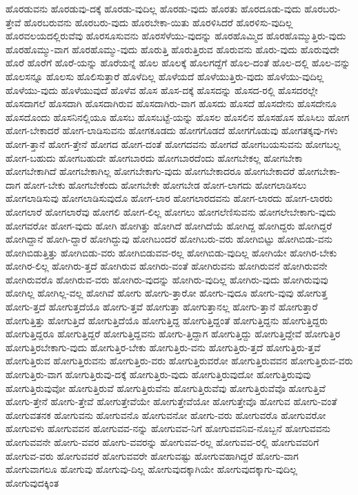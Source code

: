 {ಹೊರಡುವನು
ಹೊರಡುವು-ದಕ್ಕೆ
ಹೊರಡು-ವುದಿಲ್ಲ
ಹೊರಡು-ವುದು
ಹೊರತು
ಹೊರದೂಡು-ವುದು
ಹೊರಬರು-ತ್ತೇವೆ
ಹೊರಬರುವನು
ಹೊರಬರು-ವುದು
ಹೊರಬೇಕಾ-ಯಿತು
ಹೊರಳಿಸಿದರೆ
ಹೊರಳಿಸು-ವುದಿಲ್ಲ
ಹೊರವಲಯದಲ್ಲಿರುವೆವು
ಹೊರಸೂಸುವನು
ಹೊರಸೆಳೆಯು-ವುದನ್ನು
ಹೊರಹೊಮ್ಮಿದ
ಹೊರಹೊಮ್ಮುತ್ತಿರು-ವುದು
ಹೊರಹೊಮ್ಮು-ವಾಗ
ಹೊರಹೊಮ್ಮು-ವುದು
ಹೊರುತ್ತಿ
ಹೊರುತ್ತಿರುವ
ಹೊರುವನು
ಹೊರು-ವುದು
ಹೊರುವುದೇ
ಹೊರೆ
ಹೊರೆಗೆ
ಹೊರೆ-ಯನ್ನು
ಹೊರೆಯನ್ನೆ
ಹೊಲ
ಹೊಲಕ್ಕೆ
ಹೊಲಗದ್ದೆಗೆ
ಹೊಲ-ದಂತೆ
ಹೊಲ-ದಲ್ಲಿ
ಹೊಲ-ವನ್ನು
ಹೊಲಸನ್ನೂ
ಹೊಲಸು
ಹೊಲಿಸುತ್ತಾರೆ
ಹೊಳೆದಿಲ್ಲ
ಹೊಳೆಯದೆ
ಹೊಳೆಯುತ್ತಿರು-ವುದು
ಹೊಳೆಯು-ವುದಿಲ್ಲ
ಹೊಳೆಯು-ವುದು
ಹೊಳೆಯುವುದೆ
ಹೊಳೆವ
ಹೊಸ
ಹೊಸ-ದಕ್ಕೆ
ಹೊಸದನ್ನು
ಹೊಸದ-ರಲ್ಲಿ
ಹೊಸದರಲ್ಲೇ
ಹೊಸದಾಗಲೆ
ಹೊಸದಾಗಿ
ಹೊಸದಾಗಿರುವ
ಹೊಸದಾಗಿರು-ವಾಗ
ಹೊಸದು
ಹೊಸದೆ
ಹೊಸದೇನು
ಹೊಸದೇನೂ
ಹೊಸದೊಂದು
ಹೊಸನಿನಲ್ಲಿಯೂ
ಹೊಸಬ
ಹೊಸಬಟ್ಟೆ-ಯನ್ನು
ಹೊಸಲ
ಹೊಸಲಿನ
ಹೊಸಹೊಸ
ಹೊಸಿಲು
ಹೋಗ
ಹೋಗ-ಬೇಕಾದರೆ
ಹೋಗ-ಲಾಡಿಸುವನು
ಹೋಗಕೂಡದು
ಹೋಗಗೊಡದೆ
ಹೋಗಗೊಡುವು
ಹೋಗತಕ್ಕವು-ಗಳು
ಹೋಗ-ತ್ತಾನೆ
ಹೋಗ-ತ್ತೇನೆ
ಹೋಗದ
ಹೋಗ-ದಂತೆ
ಹೋಗದವನು
ಹೋಗದೆ
ಹೋಗಬಯಸುವನು
ಹೋಗಬಲ್ಲ
ಹೋಗ-ಬಹುದು
ಹೋಗಬಹುದೇ
ಹೋಗಬಾರದು
ಹೋಗಬಾರದೆಂದು
ಹೋಗಬೇಕಲ್ಲ
ಹೋಗಬೇಕಾ
ಹೋಗಬೇಕಾಗಿದೆ
ಹೋಗಬೇಕಾಗಿಲ್ಲ
ಹೋಗಬೇಕಾಗು-ವುದು
ಹೋಗಬೇಕಾದರೂ
ಹೋಗಬೇಕಾದರೆ
ಹೋಗಬೇಕಾ-ದಾಗ
ಹೋಗ-ಬೇಕು
ಹೋಗಬೇಕೆಂದು
ಹೋಗಬೇಕೇ
ಹೋಗಬೇಡ
ಹೋಗ-ಲಾಗದು
ಹೋಗಲಾಡಿಸಲು
ಹೋಗಲಾಡಿಸುವು
ಹೋಗಲಾಡಿಸುವುದೊ
ಹೋಗ-ಲಾರ
ಹೋಗಲಾರದವನು
ಹೋಗ-ಲಾರದು
ಹೋಗ-ಲಾರರು
ಹೋಗಲಾರೆ
ಹೋಗಲಾರೆವು
ಹೋಗಲಿ
ಹೋಗ-ಲಿಲ್ಲ
ಹೋಗಲು
ಹೋಗಲೆಣಿಸುವನು
ಹೋಗಲೇಬೇಕಾಗು-ವುದು
ಹೋಗವರೋ
ಹೋಗ-ವುದು
ಹೋಗಿ
ಹೋಗಿತ್ತು
ಹೋಗಿದೆ
ಹೋಗಿದೆಯೆ
ಹೋಗಿದ್ದ
ಹೋಗಿದ್ದರು
ಹೋಗಿದ್ದರೆ
ಹೋಗಿದ್ದಾನೆ
ಹೋಗಿ-ದ್ದಾರೆ
ಹೋಗಿದ್ದುವು
ಹೋಗಿಬಂದರೆ
ಹೋಗಿಬರು-ವರು
ಹೋಗಿಬಿಟ್ಟು
ಹೋಗಿಬಿಡು-ವನು
ಹೋಗಿಬಿಡುತ್ತಿತ್ತು
ಹೋಗಿಬಿಡು-ವರು
ಹೋಗಿಬಿಡುವವ-ರಲ್ಲ
ಹೋಗಿಬಿಡು-ವುದಿಲ್ಲ
ಹೋಗಿಯೇ
ಹೋಗಿರ-ಬೇಕು
ಹೋಗಿರ-ಲಿಲ್ಲ
ಹೋಗಿರು-ತ್ತದೆ
ಹೋಗಿರುವ
ಹೋಗಿರು-ವಂತೆ
ಹೋಗಿರುವನು
ಹೋಗಿರುವನೆ
ಹೋಗಿರುವನೇ
ಹೋಗಿರುವರೊ
ಹೋಗಿರುವ-ವರು
ಹೋಗಿರು-ವುದನ್ನು
ಹೋಗಿರು-ವುದಿಲ್ಲ
ಹೋಗಿರು-ವುದು
ಹೋಗಿರುವುವು
ಹೋಗಿಲ್ಲ
ಹೋಗಿಲ್ಲ-ವಲ್ಲ
ಹೋಗಿವೆ
ಹೋಗು
ಹೋಗು-ತ್ತಾರೋ
ಹೋಗು-ವುದೂ
ಹೋಗು-ವುವು
ಹೋಗುತ್ತ
ಹೋಗು-ತ್ತದೆ
ಹೋಗುತ್ತದೆಯೊ
ಹೋಗು-ತ್ತವೆ
ಹೋಗುತ್ತಾ
ಹೋಗುತ್ತಾನಲ್ಲ
ಹೋಗು-ತ್ತಾನೆ
ಹೋಗುತ್ತಾರೆ
ಹೋಗುತ್ತಿತ್ತು
ಹೋಗುತ್ತಿದೆ
ಹೋಗುತ್ತಿದೆಯೊ
ಹೋಗುತ್ತಿದ್ದ
ಹೋಗುತ್ತಿದ್ದಂತೆ
ಹೋಗುತ್ತಿದ್ದನು
ಹೋಗುತ್ತಿದ್ದರು
ಹೋಗುತ್ತಿದ್ದರೂ
ಹೋಗುತ್ತಿದ್ದರೆ
ಹೋಗುತ್ತಿದ್ದವನು
ಹೋಗು-ತ್ತಿದ್ದಾಗ
ಹೋಗುತ್ತಿದ್ದು
ಹೋಗುತ್ತಿದ್ದೇವೆ
ಹೋಗುತ್ತಿರ
ಹೋಗುತ್ತಿರಬೇಕಾಗು-ವುದು
ಹೋಗುತ್ತಿರ-ಬೇಕು
ಹೋಗುತ್ತಿರು-ವನು
ಹೋಗುತ್ತಿರು-ತ್ತದೆ
ಹೋಗುತ್ತಿರು-ತ್ತವೆ
ಹೋಗುತ್ತಿರುವ
ಹೋಗುತ್ತಿರುವನು
ಹೋಗುತ್ತಿರು-ವರು
ಹೋಗುತ್ತಿರುವರೋ
ಹೋಗುತ್ತಿರುವವನ
ಹೋಗುತ್ತಿರುವ-ವರು
ಹೋಗುತ್ತಿರು-ವಾಗ
ಹೋಗುತ್ತಿರುವು-ದಕ್ಕೆ
ಹೋಗುತ್ತಿರು-ವುದು
ಹೋಗುತ್ತಿರುವುದೋ
ಹೋಗುತ್ತಿರುವುವು
ಹೋಗುತ್ತಿರುವುವೋ
ಹೋಗುತ್ತಿರುವೆ
ಹೋಗುತ್ತಿರುವೆನು
ಹೋಗುತ್ತಿರುವೆವು
ಹೋಗುತ್ತಿರುವೆವೊ
ಹೋಗುತ್ತಿವೆ
ಹೋಗು-ತ್ತೇನೆ
ಹೋಗು-ತ್ತೇವೆ
ಹೋಗುತ್ತೇವೆಯೇ
ಹೋಗುತ್ತೇವೆಯೋ
ಹೋಗುತ್ತೇವೊ
ಹೋಗುವ
ಹೋಗು-ವಂತೆ
ಹೋಗುವತನಕ
ಹೋಗುವನು
ಹೋಗುವನೊ
ಹೋಗುವನೋ
ಹೋಗು-ವರು
ಹೋಗುವರೊ
ಹೋಗುವರೋ
ಹೋಗುವಳು
ಹೋಗುವವನ
ಹೋಗುವವ-ನನ್ನು
ಹೋಗುವವ-ನಿಗೆ
ಹೋಗುವವನಿವ-ನೊಬ್ಬನೆ
ಹೋಗುವವನು
ಹೋಗುವವನೇ
ಹೋಗು-ವವರ
ಹೋಗು-ವವರನ್ನು
ಹೋಗುವವ-ರಲ್ಲ
ಹೋಗುವವ-ರಲ್ಲಿ
ಹೋಗುವವರಿಗೆ
ಹೋಗುವ-ವರು
ಹೋಗುವವರೆ
ಹೋಗುವವರೇ
ಹೋಗುವಷ್ಟು
ಹೋಗುವಹಾಗಿದ್ದರೆ
ಹೋಗು-ವಾಗ
ಹೋಗುವಾಗಲೂ
ಹೋಗುವು
ಹೋಗುವು-ದಿಲ್ಲ
ಹೋಗುವುದಕ್ಕಾಗಿಯೇ
ಹೋಗುವುದಕ್ಕಾಗು-ವುದಿಲ್ಲ
ಹೋಗುವುದಕ್ಕಿಂತ
}
